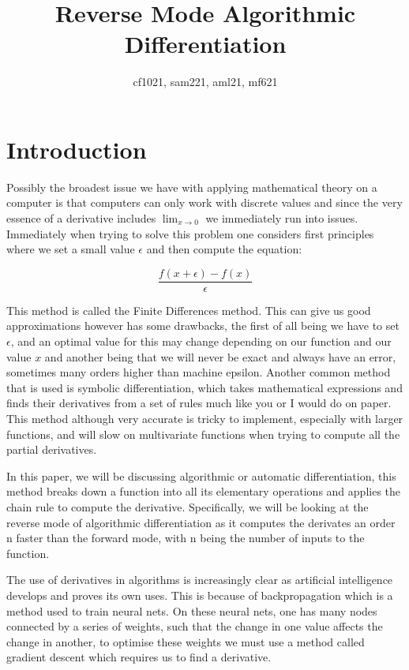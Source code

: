 \documentclass{article}
\title{Reverse Mode Algorithmic Differentiation}
\author{cf1021, sam221, aml21, mf621}
\date{}
\begin{document}
\maketitle
\tableofcontents
\newpage
\section{Introduction}

Possibly the broadest issue we have with applying mathematical theory on a computer is that computers can only work with discrete values and since the very essence of a derivative includes $\lim_{x \to 0}$ we immediately run into issues. Immediately when trying to solve this problem one considers first principles where we set a small value $\epsilon$ and then compute the equation:

\begin{equation*}
    \frac{f(x+\epsilon) - f(x)}{\epsilon}
\end{equation*}

This method is called the Finite Differences method. This can give us good approximations however has some drawbacks, the first of all being we have to set $\epsilon$, and an optimal value for this may change depending on our function and our value $x$ and another being that we will never be exact and always have an error, sometimes many orders higher than machine epsilon. Another common method that is used is symbolic differentiation, which takes mathematical expressions and finds their derivatives from a set of rules much like you or I would do on paper. This method although very accurate is tricky to implement, especially with larger functions, and will slow on multivariate functions when trying to compute all the partial derivatives.

In this paper, we will be discussing algorithmic or automatic differentiation, this method breaks down a function into all its elementary operations and applies the chain rule to compute the derivative. Specifically, we will be looking at the reverse mode of algorithmic differentiation as it computes the derivates an order n faster than the forward mode, with n being the number of inputs to the function.

The use of derivatives in algorithms is increasingly clear as artificial intelligence develops and proves its own uses. This is because of backpropagation which is a method used to train neural nets. On these neural nets, one has many nodes connected by a series of weights, such that the change in one value affects the change in another, to optimise these weights we must use a method called gradient descent which requires us to find a derivative.
\end{document}
